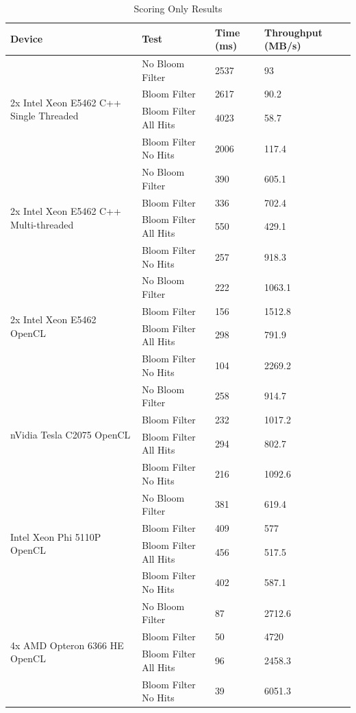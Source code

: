 \begin{table}[H]
\begin{tabular}{|l|l|l|l|}
\hline
Device & Test & Time (ms) & Throughput (MB/s)\\
\hline
\multirow{4}{*}{2x Intel Xeon E5462 C++ Single Threaded}
& No Bloom Filter & 2537 & 93 \\
& Bloom Filter & 2617 & 90.2 \\
& Bloom Filter All Hits & 4023 & 58.7 \\
& Bloom Filter No Hits & 2006 & 117.4 \\
\hline
\multirow{4}{*}{2x Intel Xeon E5462 C++ Multi-threaded}
& No Bloom Filter & 390 & 605.1 \\
& Bloom Filter & 336 & 702.4 \\
& Bloom Filter All Hits & 550 & 429.1 \\
& Bloom Filter No Hits & 257 & 918.3 \\
\hline
\multirow{4}{*}{2x Intel Xeon E5462 OpenCL}
& No Bloom Filter & 222 & 1063.1 \\
& Bloom Filter & 156 & 1512.8 \\
& Bloom Filter All Hits & 298 & 791.9 \\
& Bloom Filter No Hits & 104 & 2269.2 \\
\hline
\multirow{4}{*}{nVidia Tesla C2075 OpenCL}
& No Bloom Filter & 258 & 914.7 \\
& Bloom Filter & 232 & 1017.2 \\
& Bloom Filter All Hits & 294 & 802.7 \\
& Bloom Filter No Hits & 216 & 1092.6 \\
\hline
\multirow{4}{*}{Intel Xeon Phi 5110P OpenCL}
& No Bloom Filter & 381 & 619.4 \\
& Bloom Filter & 409 & 577 \\
& Bloom Filter All Hits & 456 & 517.5 \\
& Bloom Filter No Hits & 402 & 587.1 \\
\hline
\multirow{4}{*}{4x AMD Opteron 6366 HE OpenCL}
& No Bloom Filter & 87 & 2712.6 \\
& Bloom Filter & 50 & 4720 \\
& Bloom Filter All Hits & 96 & 2458.3 \\
& Bloom Filter No Hits & 39 & 6051.3 \\
\hline
\end{tabular}
\caption{Scoring Only Results}
\label{table:scoringOnly}
\end{table}

